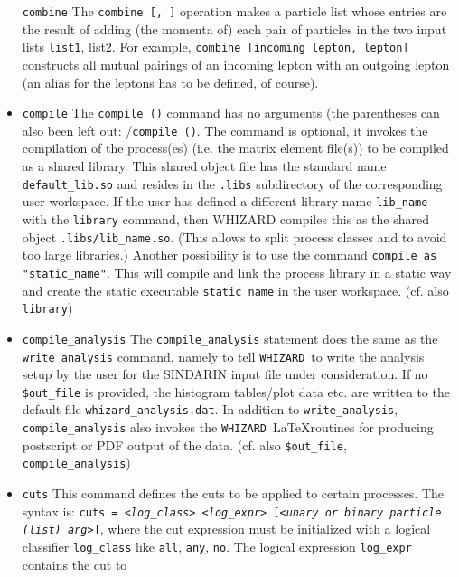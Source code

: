 \documentclass[12pt]{book}
\newcommand{\ttt}[1]{\texttt{#1}}
\newcommand{\whizard}{\texttt{WHIZARD}}
\begin{document}
\begin{itemize}
\ttt{combine} \newline
The \ttt{combine [{\em <list1>}, {\em <list2>}]} operation makes a particle list
whose entries are the result of adding (the momenta of) each pair of
particles in the two input lists \ttt{list1}, {list2}. For example,
\ttt{combine [incoming lepton, lepton]} constructs all mutual pairings
of an incoming lepton with an outgoing lepton (an alias for the
leptons has to be defined, of course).
\item
\ttt{compile} \newline 
The \ttt{compile ()} command has no arguments (the parentheses can
also been left out: /\ttt{compile ()}. The command is optional, it
invokes the compilation of the process(es) (i.e. the matrix element
file(s)) to be compiled as a shared library. This shared object file
has the standard name \ttt{default\_lib.so} and resides in the
\ttt{.libs} subdirectory of the corresponding user workspace. If the
user has defined a different library name \ttt{lib\_name} with the
\ttt{library} command, then WHIZARD compiles this as the shared object
\ttt{.libs/lib\_name.so}. (This allows to split process classes and to
avoid too large libraries.) 
Another possibility is to use the command \ttt{compile as
  "static\_name"}. This will compile and link the process library in a
static way and create the static executable \ttt{static\_name} in the
user workspace. (cf. also \ttt{library})
\item
\ttt{compile\_analysis} \newline
The \ttt{compile\_analysis} statement does the same as
the \ttt{write\_analysis} command, namely to tell \whizard\ to write
the analysis setup by the user for the SINDARIN input file under 
consideration. If no \ttt{\$out\_file} is provided, the histogram
tables/plot data etc. are written to the default file
\ttt{whizard\_analysis.dat}. In addition to \ttt{write\_analysis}, 
\ttt{compile\_analysis} also invokes the \whizard\ \LaTeX routines for
producing postscript or PDF output of the data.
(cf. also \ttt{\$out\_file}, \ttt{compile\_analysis})
\item
\ttt{cuts} \newline
This command defines the cuts to be applied to certain processes. The
syntax is: \ttt{cuts = {\em <log\_class>} {\em <log\_expr>} [{\em <unary or binary
  particle (list) arg>}]}, where the cut expression must be initialized
with a logical classifier \ttt{log\_class} like \ttt{all}, \ttt{any},
\ttt{no}. The logical expression \ttt{log\_expr} contains the cut to

\end{itemize}
\end{document}
